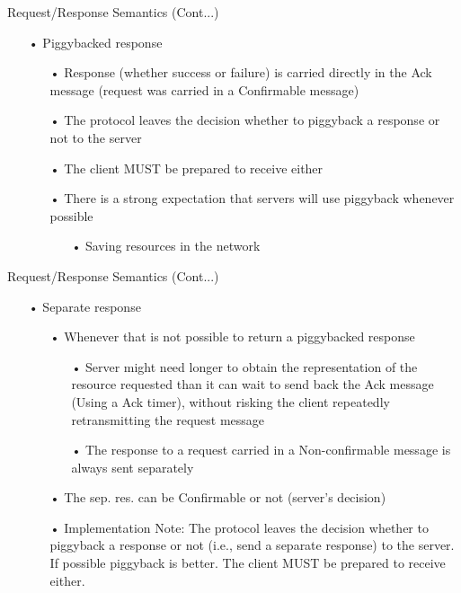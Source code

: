 \documentclass[11pt]{beamer}
\begin{document}
\begin{frame}{Request/Response Semantics (Cont...)}
\begin{itemize}
\item[•] Piggybacked response
\begin{itemize}
\item[•] Response (whether success or failure) is carried directly in the Ack message (request was carried in a Confirmable message)
\item[•] The protocol leaves the decision whether to piggyback a response or not to the server
\item[•] The client MUST be prepared to receive either
\item[•] There is a strong expectation that servers will use piggyback whenever possible
\begin{itemize}
\item[•] Saving resources in the network
\end{itemize}
\end{itemize}
\end{itemize}
\end{frame}
\begin{frame}{Request/Response Semantics (Cont...)}
\begin{itemize}
\item[•] Separate response
\begin{itemize}
\item[•] Whenever that is not possible to return a piggybacked response
\begin{itemize}
\item[•] Server might need longer to obtain the representation of the resource requested than it can wait to send back the Ack message (Using a Ack timer), without risking the client repeatedly retransmitting the request message
\item[•] The response to a request carried in a Non-confirmable message is always sent separately
\end{itemize}
\item[•] The sep. res. can be Confirmable or not (server's decision)
\item[•] Implementation Note:  The protocol leaves the decision whether to piggyback a response or not (i.e., send a separate response) to the server. If possible piggyback is better. The client MUST be prepared to receive either. 
\end{itemize}
\end{itemize}
\end{frame}
\end{document}
